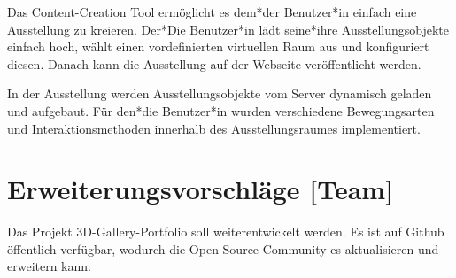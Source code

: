 Das Content-Creation Tool ermöglicht es dem*der Benutzer*in einfach eine Ausstellung zu kreieren. Der*Die Benutzer*in lädt seine*ihre Ausstellungsobjekte einfach hoch, wählt einen vordefinierten virtuellen Raum aus und konfiguriert diesen. Danach kann die Ausstellung auf der Webseite veröffentlicht werden.

In der Ausstellung werden Ausstellungsobjekte vom Server dynamisch geladen und aufgebaut. Für den*die Benutzer*in wurden verschiedene Bewegungsarten und Interaktionsmethoden innerhalb des Ausstellungsraumes implementiert.

\section{Erweiterungsvorschläge [Team]} 
Das Projekt 3D-Gallery-Portfolio soll weiterentwickelt werden. Es ist auf Github öffentlich verfügbar, wodurch die Open-Source-Community es aktualisieren und erweitern kann.